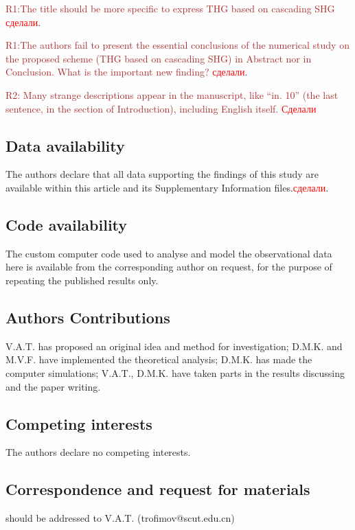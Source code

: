 \documentclass[a4paper, 12pt, onecolumn]{extarticle}
\begin{document}
\textcolor{brown}{R1:The title should be more specific to express THG based on cascading SHG} \textcolor{red}{сделали}.

\textcolor{brown}{R1:The authors fail to present the essential conclusions of the numerical study on the proposed scheme (THG based on cascading SHG) in Abstract nor in Conclusion. What is the important new finding?} \textcolor{red}{сделали}.

 \textcolor{brown}{R2: Many strange descriptions appear in the manuscript, like “in. 10” (the last sentence, in the section of Introduction), including English itself.} \textcolor{red}{ Сделали}

\subsection*{Data availability}
The authors declare that all data supporting the findings of this study are available
within this article and its Supplementary Information files.\textcolor{red}{сделали}.

\subsection*{Code availability}
The custom computer code used to analyse and model the observational data here is available from the corresponding author on request, for the purpose of repeating 
the published results only.

\subsection*{Authors Contributions}
V.A.T. has proposed an original idea and method for investigation; D.M.K. and M.V.F. have implemented the theoretical analysis; D.M.K. has made the computer simulations; V.A.T., D.M.K. have taken parts in the results discussing and the paper writing.

\subsection*{Competing interests}
The authors declare no competing interests.

\subsection*{Correspondence and request for materials}
should be addressed to V.A.T. (trofimov@scut.edu.cn)
\end{document}
